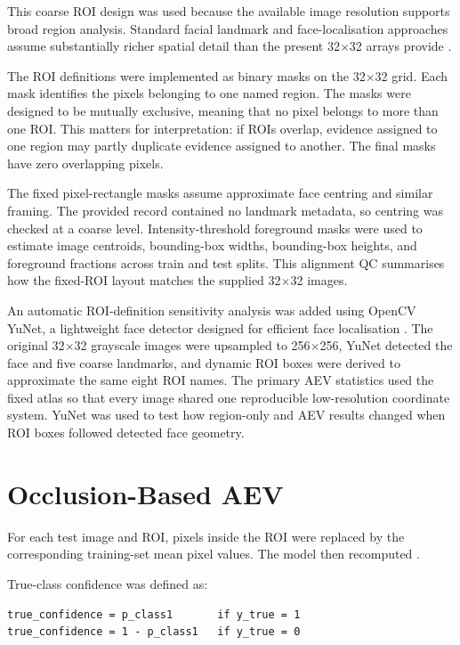 This coarse ROI design was used because the available image resolution supports broad region analysis. Standard facial landmark and face-localisation approaches assume substantially richer spatial detail than the present 32$\times$32 arrays provide    .


The ROI definitions were implemented as binary masks on the 32$\times$32 grid. Each mask identifies the pixels belonging to one named region. The masks were designed to be mutually exclusive, meaning that no pixel belongs to more than one ROI. This matters for interpretation: if ROIs overlap, evidence assigned to one region may partly duplicate evidence assigned to another. The final masks have zero overlapping pixels.


The fixed pixel-rectangle masks assume approximate face centring and similar framing. The provided record contained no landmark metadata, so centring was checked at a coarse level. Intensity-threshold foreground masks were used to estimate image centroids, bounding-box widths, bounding-box heights, and foreground fractions across train and test splits. This alignment QC summarises how the fixed-ROI layout matches the supplied 32$\times$32 images.


An automatic ROI-definition sensitivity analysis was added using OpenCV YuNet, a lightweight face detector designed for efficient face localisation . The original 32$\times$32 grayscale images were upsampled to 256$\times$256, YuNet detected the face and five coarse landmarks, and dynamic ROI boxes were derived to approximate the same eight ROI names. The primary AEV statistics used the fixed atlas so that every image shared one reproducible low-resolution coordinate system. YuNet was used to test how region-only and AEV results changed when ROI boxes followed detected face geometry.


\section{Occlusion-Based AEV}

For each test image and ROI, pixels inside the ROI were replaced by the corresponding training-set mean pixel values. The model then recomputed \texttt{}.


True-class confidence was defined as:


\begin{verbatim}
true_confidence = p_class1       if y_true = 1
true_confidence = 1 - p_class1   if y_true = 0
\end{verbatim}

